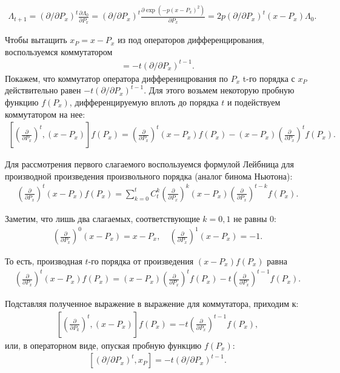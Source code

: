 \documentclass[a4paper,12pt]{extarticle}
\newcommand{\lb}{\left(}
\newcommand{\rb}{\right)}
\newcommand{\lsq}{\left[}
\newcommand{\rsq}{\right]}
\begin{document}
\begin{gather}
		\Lambda_{t + 1} = (\partial / \partial P_x)^t \frac{\partial \Lambda_0}{\partial P_x} = (\partial / \partial P_x)^t \frac{\partial \exp \lb -p (x - P_x)^2 \rb}{\partial P_x}  = 2p (\partial / \partial P_x)^t (x - P_x) \Lambda_0. \label{lambda_t_plus_one} 
\end{gather}

Чтобы вытащить $x_P = x - P_x$ из под операторов дифференцирования, воспользуемся коммутатором
\begin{gather}
	[ (\partial / \partial P_x)^t, x_P ] = -t (\partial / \partial P_x)^{t - 1}.
\end{gather}
Покажем, что коммутатор оператора дифференицрования по $P_x$ t-го порядка с $x_P$ действительно равен $-t (\partial / \partial P_x)^{t - 1}$. Для этого возьмем некоторую пробную функцию $f(P_x)$, дифференцируемую вплоть до порядка $t$ и подействуем коммутатором на нее:
\begin{gather}
		\lsq \lb \frac{\partial}{\partial P_x} \rb^t, (x - P_x) \rsq f(P_x) = \lb \frac{\partial}{\partial P_x} \rb^t (x - P_x) f(P_x) - (x - P_x) \lb \frac{\partial}{\partial P_x} \rb^t f(P_x).
\end{gather}

Для рассмотрения первого слагаемого воспользуемся формулой Лейбница для производной произведения произвольного порядка (аналог бинома Ньютона):
\begin{gather}
	\lb \frac{\partial}{\partial P_x} \rb^t (x - P_x) f(P_x) = \sum_{k = 0}^{t} C_{t}^{k} \lb \frac{\partial}{\partial P_x} \rb^{k} \lb x - P_x \rb \lb \frac{\partial}{\partial P_x} \rb^{t - k} f(P_x).
\end{gather}

Заметим, что лишь два слагаемых, соответствующие $k = 0, 1$ не равны 0:
\begin{gather}
	\lb \frac{\partial}{\partial P_x} \rb^0 (x - P_x) = x - P_x, \quad  \lb \frac{\partial}{\partial P_x} \rb^1 (x - P_x) = -1. 
\end{gather}

То есть, производная $t$-го порядка от произведения $(x - P_x) f(P_x)$ равна
\begin{gather}
		\lb \frac{\partial}{\partial P_x} \rb^t (x - P_x) f(P_x) = (x - P_x) \lb \frac{\partial}{\partial P_x} \rb^t f(P_x) - t \lb \frac{\partial}{\partial P_x} \rb^{t - 1} f(P_x). 
\end{gather}

Подставляя полученное выражение в выражение для коммутатора, приходим к:
\begin{gather}
	\lsq \lb \frac{\partial}{\partial P_k} \rb^t, (x - P_x) \rsq f(P_x) = - t \lb \frac{\partial}{\partial P_x} \rb^{t - 1} f(P_x), 
\end{gather}
или, в операторном виде, опуская пробную функцию $f(P_x)$:
\begin{gather}
	\lsq \lb \partial / \partial P_x \rb^t, x_P \rsq = -t \lb \partial / \partial P_x \rb^{t - 1}.
\end{gather}
\end{document}
